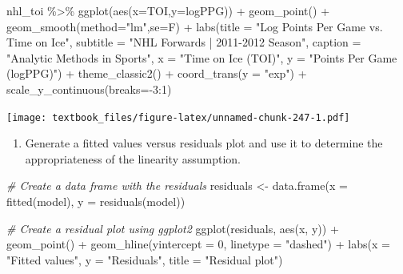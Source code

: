 \documentclass[
  11pt,
]{book}
\newenvironment{Shaded}{\begin{snugshade}}{\end{snugshade}}
\newcommand{\AttributeTok}[1]{\textcolor[rgb]{0.77,0.63,0.00}{#1}}
\newcommand{\CommentTok}[1]{\textcolor[rgb]{0.56,0.35,0.01}{\textit{#1}}}
\newcommand{\DecValTok}[1]{\textcolor[rgb]{0.00,0.00,0.81}{#1}}
\newcommand{\FunctionTok}[1]{\textcolor[rgb]{0.00,0.00,0.00}{#1}}
\newcommand{\NormalTok}[1]{#1}
\newcommand{\OtherTok}[1]{\textcolor[rgb]{0.56,0.35,0.01}{#1}}
\newcommand{\SpecialCharTok}[1]{\textcolor[rgb]{0.00,0.00,0.00}{#1}}
\newcommand{\StringTok}[1]{\textcolor[rgb]{0.31,0.60,0.02}{#1}}
\providecommand{\tightlist}{%
  \setlength{\itemsep}{0pt}\setlength{\parskip}{0pt}}
\theoremstyle{definition}
\theoremstyle{definition}
\theoremstyle{definition}
\theoremstyle{definition}
\theoremstyle{remark}
\begin{document}
\begin{Shaded}
\begin{Highlighting}[]
\NormalTok{nhl\_toi }\SpecialCharTok{\%\textgreater{}\%} \FunctionTok{ggplot}\NormalTok{(}\FunctionTok{aes}\NormalTok{(}\AttributeTok{x=}\NormalTok{TOI,}\AttributeTok{y=}\NormalTok{logPPG)) }\SpecialCharTok{+}
  \FunctionTok{geom\_point}\NormalTok{() }\SpecialCharTok{+}
  \FunctionTok{geom\_smooth}\NormalTok{(}\AttributeTok{method=}\StringTok{"lm"}\NormalTok{,}\AttributeTok{se=}\NormalTok{F) }\SpecialCharTok{+} 
  \FunctionTok{labs}\NormalTok{(}\AttributeTok{title =} \StringTok{"Log Points Per Game vs. Time on Ice"}\NormalTok{,}
       \AttributeTok{subtitle =} \StringTok{"NHL Forwards | 2011{-}2012 Season"}\NormalTok{,}
       \AttributeTok{caption =} \StringTok{"Analytic Methods in Sports"}\NormalTok{, }
       \AttributeTok{x =} \StringTok{"Time on Ice (TOI)"}\NormalTok{,}
       \AttributeTok{y =} \StringTok{"Points Per Game (logPPG)"}\NormalTok{) }\SpecialCharTok{+}
  \FunctionTok{theme\_classic2}\NormalTok{() }\SpecialCharTok{+}
  \FunctionTok{coord\_trans}\NormalTok{(}\AttributeTok{y =} \StringTok{"exp"}\NormalTok{)  }\SpecialCharTok{+}
  \FunctionTok{scale\_y\_continuous}\NormalTok{(}\AttributeTok{breaks=}\SpecialCharTok{{-}}\DecValTok{3}\SpecialCharTok{:}\DecValTok{1}\NormalTok{)}
\end{Highlighting}
\end{Shaded}

\texttt{[image: textbook\_files/figure-latex/unnamed-chunk-247-1.pdf]}

\newpage

\begin{enumerate}
\def\labelenumi{(\alph{enumi})}
\setcounter{enumi}{3}
\tightlist
\item
  Generate a fitted values versus residuals plot and use it to determine the appropriateness of the linearity assumption.
\end{enumerate}

\begin{Shaded}
\begin{Highlighting}[]
\CommentTok{\# Create a data frame with the residuals}
\NormalTok{residuals }\OtherTok{\textless{}{-}} \FunctionTok{data.frame}\NormalTok{(}\AttributeTok{x =} \FunctionTok{fitted}\NormalTok{(model), }\AttributeTok{y =} \FunctionTok{residuals}\NormalTok{(model))}

\CommentTok{\# Create a residual plot using ggplot2}
\FunctionTok{ggplot}\NormalTok{(residuals, }\FunctionTok{aes}\NormalTok{(x, y)) }\SpecialCharTok{+}
  \FunctionTok{geom\_point}\NormalTok{() }\SpecialCharTok{+}
  \FunctionTok{geom\_hline}\NormalTok{(}\AttributeTok{yintercept =} \DecValTok{0}\NormalTok{, }\AttributeTok{linetype =} \StringTok{"dashed"}\NormalTok{) }\SpecialCharTok{+}
  \FunctionTok{labs}\NormalTok{(}\AttributeTok{x =} \StringTok{"Fitted values"}\NormalTok{, }\AttributeTok{y =} \StringTok{"Residuals"}\NormalTok{, }\AttributeTok{title =} \StringTok{"Residual plot"}\NormalTok{)}
\end{Highlighting}
\end{Shaded}
\end{document}

